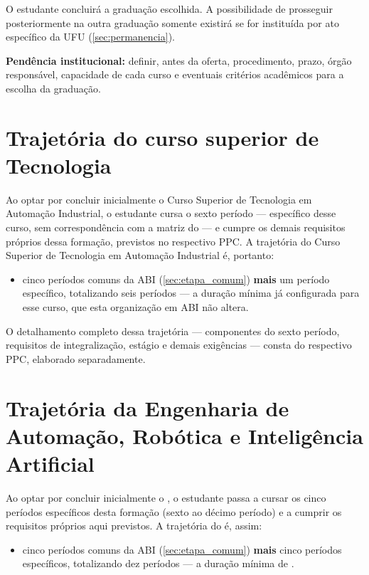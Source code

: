 O estudante concluirá a graduação escolhida. A possibilidade de prosseguir posteriormente na outra graduação somente existirá se for instituída por ato específico da UFU (\autoref{sec:permanencia}).

\textbf{Pendência institucional:} definir, antes da oferta, procedimento, prazo, órgão responsável, capacidade de cada curso e eventuais critérios acadêmicos para a escolha da graduação.

\section{Trajetória do curso superior de Tecnologia}
\label{sec:trajetoria_tecnologo}

Ao optar por concluir inicialmente o Curso Superior de Tecnologia em Automação Industrial, o estudante cursa o sexto período — específico desse curso, sem correspondência com a matriz do \ppccurso — e cumpre os demais requisitos próprios dessa formação, previstos no respectivo PPC. A trajetória do Curso Superior de Tecnologia em Automação Industrial é, portanto:

\begin{itemize}
    \item cinco períodos comuns da ABI (\autoref{sec:etapa_comum}) \textbf{mais} um período específico, totalizando seis períodos — a duração mínima já configurada para esse curso, que esta organização em ABI não altera.
\end{itemize}

O detalhamento completo dessa trajetória — componentes do sexto período, requisitos de integralização, estágio e demais exigências — consta do respectivo PPC, elaborado separadamente.

\section{Trajetória da Engenharia de Automação, Robótica e Inteligência Artificial}
\label{sec:trajetoria_engenharia}

Ao optar por concluir inicialmente o \ppccurso, o estudante passa a cursar os cinco períodos específicos desta formação (sexto ao décimo período) e a cumprir os requisitos próprios aqui previstos. A trajetória do \ppccurso é, assim:

\begin{itemize}
    \item cinco períodos comuns da ABI (\autoref{sec:etapa_comum}) \textbf{mais} cinco períodos específicos, totalizando dez períodos — a duração mínima de \ppctempominimo.
\end{itemize}

